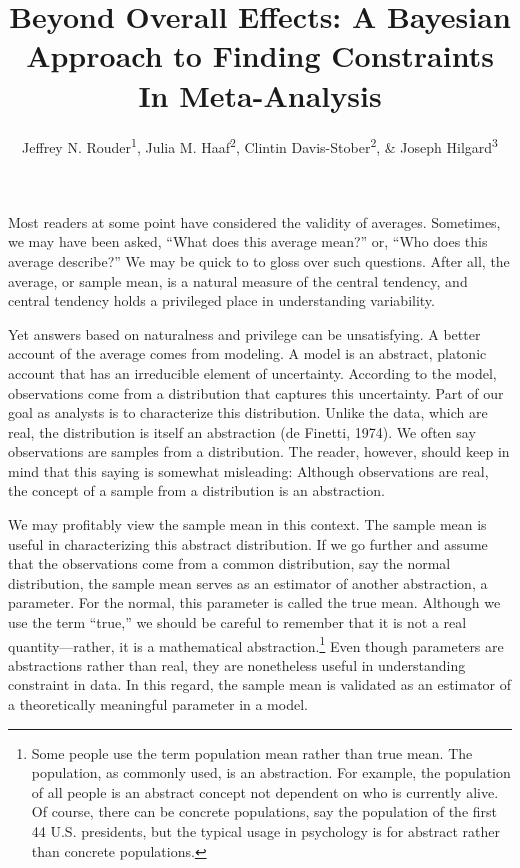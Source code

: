 \documentclass[english,man]{apa6}
\title{Beyond Overall Effects: A Bayesian Approach to Finding Constraints In
Meta-Analysis}
\author{Jeffrey N. Rouder\textsuperscript{1}, Julia M. Haaf\textsuperscript{2}, Clintin Davis-Stober\textsuperscript{2}, \& Joseph Hilgard\textsuperscript{3}}
\affiliation{
    \vspace{0.5cm}
          \textsuperscript{1} University of California, Irvine\\
          \textsuperscript{2} University of Missouri\\
          \textsuperscript{3} Illinois State University  }
\theoremstyle{definition}
\theoremstyle{definition}
\theoremstyle{remark}
\begin{document}
\maketitle

\setcounter{secnumdepth}{0}



Most readers at some point have considered the validity of averages.
Sometimes, we may have been asked, \enquote{What does this average
mean?} or, \enquote{Who does this average describe?} We may be quick to
to gloss over such questions. After all, the average, or sample mean, is
a natural measure of the central tendency, and central tendency holds a
privileged place in understanding variability.

Yet answers based on naturalness and privilege can be unsatisfying. A
better account of the average comes from modeling. A model is an
abstract, platonic account that has an irreducible element of
uncertainty. According to the model, observations come from a
distribution that captures this uncertainty. Part of our goal as
analysts is to characterize this distribution. Unlike the data, which
are real, the distribution is itself an abstraction (de Finetti, 1974).
We often say observations are samples from a distribution. The reader,
however, should keep in mind that this saying is somewhat misleading:
Although observations are real, the concept of a sample from a
distribution is an abstraction.

We may profitably view the sample mean in this context. The sample mean
is useful in characterizing this abstract distribution. If we go further
and assume that the observations come from a common distribution, say
the normal distribution, the sample mean serves as an estimator of
another abstraction, a parameter. For the normal, this parameter is
called the true mean. Although we use the term \enquote{true,} we should
be careful to remember that it is not a real quantity---rather, it is a
mathematical abstraction.\footnote{Some people use the term population
  mean rather than true mean. The population, as commonly used, is an
  abstraction. For example, the population of all people is an abstract
  concept not dependent on who is currently alive. Of course, there can
  be concrete populations, say the population of the first 44 U.S.
  presidents, but the typical usage in psychology is for abstract rather
  than concrete populations.} Even though parameters are abstractions
rather than real, they are nonetheless useful in understanding
constraint in data. In this regard, the sample mean is validated as an
estimator of a theoretically meaningful parameter in a model.
\end{document}
